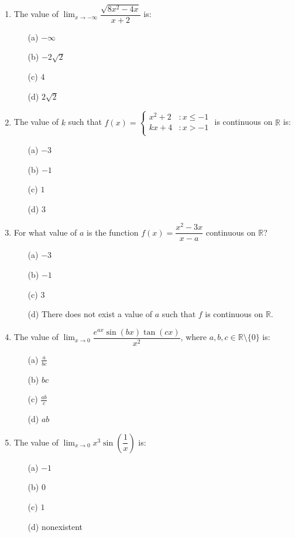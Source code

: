 \documentclass[12pt]{book}
\begin{document}
\begin{enumerate}
\item The value of $\lim_{x\to -\infty}\limits \dfrac{\sqrt{8x^2 - 4x}}{x+2}$ is:
\begin{enumerate}
\item[(a)] $-\infty$
\item[(b)] $-2\sqrt{2}$
\item[(c)] $4$
\item[(d)] $2\sqrt{2}$
\end{enumerate}


\newpage

\item The value of $k$ such that $f(x) = \begin{cases} 
      x^2 + 2 & : x \le -1 \\
      kx+4 & : x>-1 \\
   \end{cases}$ is continuous on $\mathbb{R}$ is: 
\begin{enumerate}
\item[(a)] $-3$
\item[(b)] $-1$
\item[(c)] $1$
\item[(d)] $3$
\end{enumerate}

\item For what value of $a$ is the function $f(x) = \dfrac{x^2 - 3x}{x-a}$ continuous on $\mathbb{R}$?
\begin{enumerate}
\item[(a)] $-3$
\item[(b)] $-1$
\item[(c)] $3$
\item[(d)] There does not exist a value of $a$ such that $f$ is continuous on $\mathbb{R}$.
\end{enumerate}

\item The value of $\lim_{x\to 0}\limits \dfrac{e^{ax} \sin(bx) \tan(cx)}{x^2}$, where $a,b,c \in \mathbb{R}\setminus\{0\}$ is:
\begin{enumerate}
\item[(a)] $\frac{a}{bc}$
\item[(b)] $bc$
\item[(c)] $\frac{ab}{c}$
\item[(d)] $ab$
\end{enumerate}

\item The value of $\lim_{x\to 0}\limits x^3 \sin\left(\dfrac{1}{x}\right)$ is:
\begin{enumerate}
\item[(a)] $-1$
\item[(b)] $0$
\item[(c)] $1$
\item[(d)] nonexistent
\end{enumerate}


\end{enumerate}
\end{document}
